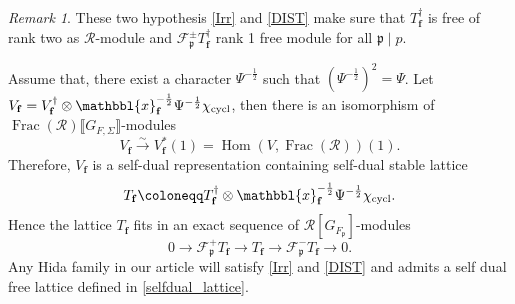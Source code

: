\documentclass[10pt]{amsart}
\numberwithin{equation}{section}
\theoremstyle{definition}
\theoremstyle{remark} %
\newtheorem{rmk}[thm]{Remark}
\newcommand{\Hom}{\operatorname{Hom}}
\newcommand{\f}{\mathbf{f}}
\newcommand{\scrF}{\mathscr{F}}
\newcommand{\p}{\mathfrak{p}}
\newcommand{\R}{\mathcal{R}}
\begin{document}
	\begin{rmk}
		These two hypothesis \ref{Irr} and \ref{DIST} make sure that $ T_{\f}^\dagger $ is free of rank two as $ \R $-module and $ \scrF_{\p}^\pm T_{\f}^\dagger $ rank 1 free module for all $ \p \mid p $.
	\end{rmk}
	Assume that, there exist a character $ \Psi^{-\frac{1}{2}} $ such that $ (\Psi^{-\frac{1}{2}})^2 = \Psi $. Let $ V_\f = V_\f^\dagger \otimes \mathbbl{x}_\f^{-\frac{1}{2}}\Psi^{-\frac{1}{2}}\chi_{\mathrm{cycl}} $, then there is an isomorphism of $ \operatorname{Frac}(\R)\llbracket G_{F,\Sigma} \rrbracket $-modules
	\begin{equation*}
		V_\f \xrightarrow{\sim} V_\f^*(1) = \Hom(V,\operatorname{Frac}(\R))(1). 
	\end{equation*}
	Therefore, $ V_\f $ is a self-dual representation containing self-dual stable lattice
	\begin{equation} \label{selfdual_lattice}
		T_\f\coloneqq T_\f^\dagger \otimes \mathbbl{x}_\f^{-\frac{1}{2}}\Psi^{-\frac{1}{2}}\chi_{\mathrm{cycl}} .
	\end{equation} Hence the lattice $ T_{\f} $ fits in an exact sequence of $ \R[G_{F_\p}] $-modules
	\begin{equation*}
		0 \rightarrow \scrF^+_{\p} T_{\f} \rightarrow T_{\f} \rightarrow \scrF^-_{\p} T_{\f} \rightarrow 0.
	\end{equation*}
	Any Hida family in our article will satisfy \ref{Irr} and \ref{DIST} and admits a self dual free lattice defined in \eqref{selfdual_lattice}. 
\end{document}
